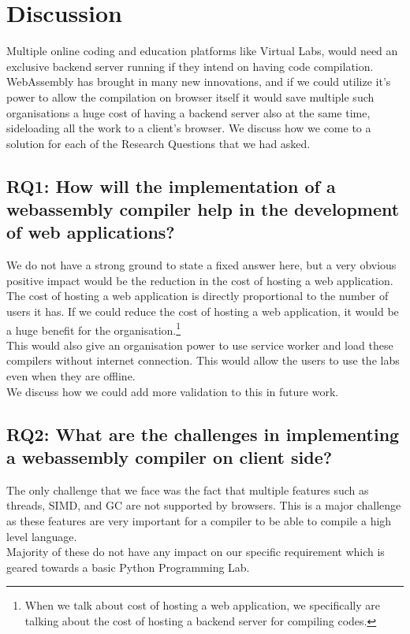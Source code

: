 \section{Discussion}
Multiple online coding and education platforms like Virtual Labs, would need an exclusive backend server running if they intend on having code compilation. WebAssembly has brought in many new innovations, and if we could utilize it$’$s power to allow the compilation on browser itself it would save multiple such organisations a huge cost of having a backend server also at the same time, sideloading all the work to a client$’$s browser. We discuss how we come to a solution for each of the Research Questions that we had asked.

\subsection{RQ1: How will the implementation of a webassembly compiler help in the development of web applications?}
We do not have a strong ground to state a fixed answer here, but a very obvious positive impact would be the reduction in the cost of hosting a web application. The cost of hosting a web application is directly proportional to the number of users it has. If we could reduce the cost of hosting a web application, it would be a huge benefit for the organisation.\footnote{When we talk about cost of hosting a web application, we specifically are talking about the cost of hosting a backend server for compiling codes.} \\
This would also give an organisation power to use service worker and load these compilers without internet connection. This would allow the users to use the labs even when they are offline. \\
We discuss how we could add more validation to this in future work.

\subsection{RQ2: What are the challenges in implementing a webassembly compiler on client side?}
The only challenge that we face was the fact that multiple features such as threads, SIMD, and GC are not supported by browsers. This is a major challenge as these features are very important for a compiler to be able to compile a high level language.\\ 
Majority of these do not have any impact on our specific requirement which is geared towards a basic Python Programming Lab. \\

